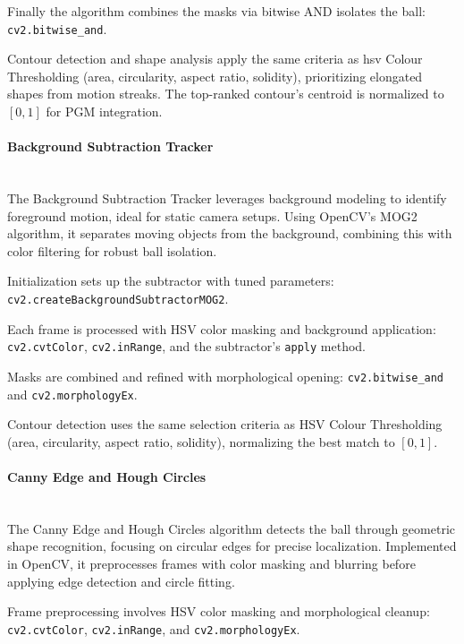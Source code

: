 \documentclass[12pt,a4paper]{article}
\begin{document}
Finally the algorithm combines the masks via bitwise AND isolates the ball:\\ \texttt{cv2.bitwise\_and}.

Contour detection and shape analysis apply the same criteria as \acs{hsv} Colour Thresholding (area, circularity, aspect ratio, solidity), prioritizing elongated shapes from motion streaks. The top-ranked contour's centroid is normalized to $[0,1]$ for PGM integration. 

\paragraph{Background Subtraction Tracker}
\mbox{}\\
The Background Subtraction Tracker leverages background modeling to identify foreground motion, ideal for static camera setups. Using OpenCV's MOG2 algorithm, it separates moving objects from the background, combining this with color filtering for robust ball isolation.

Initialization sets up the subtractor with tuned parameters:\\ \texttt{cv2.createBackgroundSubtractorMOG2}.

Each frame is processed with HSV color masking and background application: \texttt{cv2.cvtColor}, \texttt{cv2.inRange}, and the subtractor's \texttt{apply} method.

Masks are combined and refined with morphological opening: \texttt{cv2.bitwise\_and} and \texttt{cv2.morphologyEx}.

Contour detection uses the same selection criteria as HSV Colour Thresholding (area, circularity, aspect ratio, solidity), normalizing the best match to $[0,1]$. 

\paragraph{Canny Edge and Hough Circles}
\mbox{}\\

The Canny Edge and Hough Circles algorithm detects the ball through geometric shape recognition, focusing on circular edges for precise localization. Implemented in OpenCV, it preprocesses frames with color masking and blurring before applying edge detection and circle fitting.

Frame preprocessing involves HSV color masking and morphological cleanup: \texttt{cv2.cvtColor}, \texttt{cv2.inRange}, and \texttt{cv2.morphologyEx}.
\end{document}
